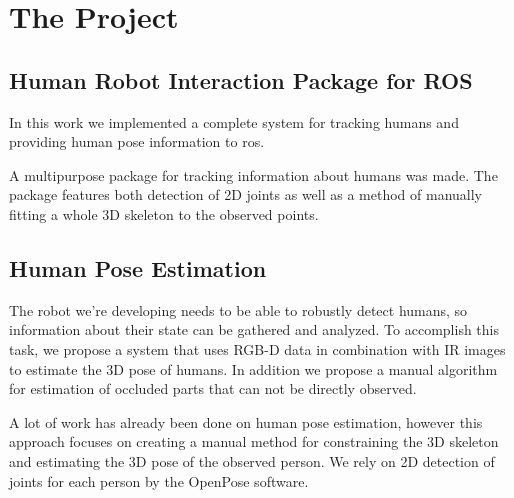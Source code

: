 \chapter{The Project}

\section{Human Robot Interaction Package for ROS}




In this work we implemented a complete system for tracking humans and providing human pose information to \ac{ros}. 

A multipurpose package for tracking information about humans was made. The package features both detection of 2D joints as well as a method of manually fitting a whole 3D skeleton to the observed points.

\section{Human Pose Estimation}

The robot we're developing needs to be able to robustly detect humans, so information about their state can be gathered and analyzed. To accomplish this task, we propose a system that uses RGB-D data in combination with IR images to estimate the 3D pose of humans. In addition we propose a manual algorithm for estimation of occluded parts that can not be directly observed. 

A lot of work has already been done on human pose estimation, however this approach focuses on creating a manual method for constraining the 3D skeleton and estimating the 3D pose of the observed person. We rely on 2D detection of joints for each person by the OpenPose software. 

